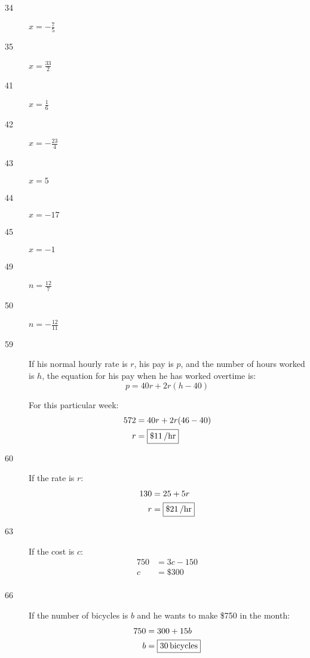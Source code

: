 \documentclass[letterpaper, landscape]{exam}
\begin{document}
\begin{description}
      \item[34] $x = \boxed{ - \frac{7}{5} }$

      \item[35] $x = \boxed{ \frac{33}{2} }$

      \item[41] $x = \boxed{ \frac{1}{6} }$

      \item[42] $x = \boxed{ - \frac{23}{4} }$
        
      \item[43] $x = \boxed{ 5 }$

      \item[44] $x = \boxed{ -17 }$

      \item[45] $x = \boxed{ -1 }$

      \item[49] $n = \boxed{ \frac{12}{7} }$

      \item[50] $n = \boxed{ - \frac{12}{11} }$

      \item[59]
          If his normal hourly rate is $r$, his pay is $p$, and the number of hours worked is $h$, the
          equation for his pay when he has worked overtime is:
          \[
            p = 40r + 2r(h - 40)
          \]

          For this particular week:
          \begin{align*}
            572 & = 40r + 2r(46 - 40) \\
            r   & = \boxed{ \unit[\$11]{/hr} } \\
          \end{align*}

      \item[60]
          If the rate is $r$:
          \begin{align*}
            130 & = 25 + 5r \\
            r   & = \boxed{ \unit[\$21]{/hr} } \\
          \end{align*}

      \item[63]
          If the cost is $c$:
          \begin{align*}
            750 & = 3c - 150 \\
            c   & = \boxed{ \$300 } \\
          \end{align*}

      \item[66]
          If the number of bicycles is $b$ and he wants to make \$750 in the month:
          \begin{align*}
            750 & = 300 + 15b \\
            b   & = \boxed{ \unit[30]{bicycles} } \\
          \end{align*}

    \end{description}
\end{document}
